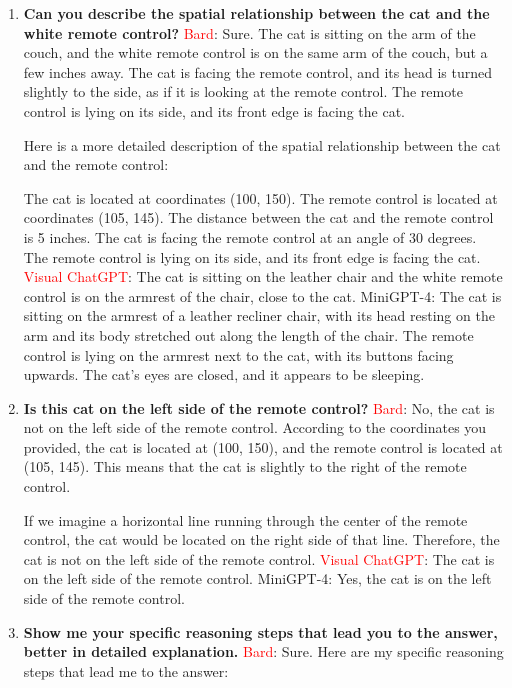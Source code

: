     \begin{enumerate}
        \item \textbf{Can you describe the spatial relationship between the cat and the white remote control?}
        \subitem \textcolor{Red}{Bard}: 
        Sure. The cat is sitting on the arm of the couch, and the white remote control is on the same arm of the couch, but a few inches away. The cat is facing the remote control, and its head is turned slightly to the side, as if it is looking at the remote control. The remote control is lying on its side, and its front edge is facing the cat.
        
        Here is a more detailed description of the spatial relationship between the cat and the remote control:
        
        The cat is located at coordinates (100, 150).
        The remote control is located at coordinates (105, 145).
        The distance between the cat and the remote control is 5 inches.
        The cat is facing the remote control at an angle of 30 degrees.
        The remote control is lying on its side, and its front edge is facing the cat.
        \subitem \textcolor{red}{Visual ChatGPT}: The cat is sitting on the leather chair and the white remote control is on the armrest of the chair, close to the cat.
        \subitem MiniGPT-4: The cat is sitting on the armrest of a leather recliner chair, with its head resting on the arm and its body stretched out along the length of the chair. The remote control is lying on the armrest next to the cat, with its buttons facing upwards. The cat’s eyes are closed, and it appears to be sleeping.
        \item \textbf{Is this cat on the left side of the remote control?}
        \subitem \textcolor{Red}{Bard}: 
        No, the cat is not on the left side of the remote control. According to the coordinates you provided, the cat is located at (100, 150), and the remote control is located at (105, 145). This means that the cat is slightly to the right of the remote control.

        If we imagine a horizontal line running through the center of the remote control, the cat would be located on the right side of that line. Therefore, the cat is not on the left side of the remote control.
        \subitem \textcolor{red}{Visual ChatGPT}: The cat is on the left side of the remote control. 
        \subitem MiniGPT-4: Yes, the cat is on the left side of the remote control.
        \item \textbf{Show me your specific reasoning steps that lead you to the answer, better in detailed explanation.}
        \subitem \textcolor{Red}{Bard}: 
        Sure. Here are my specific reasoning steps that lead me to the answer:


\end{enumerate}
